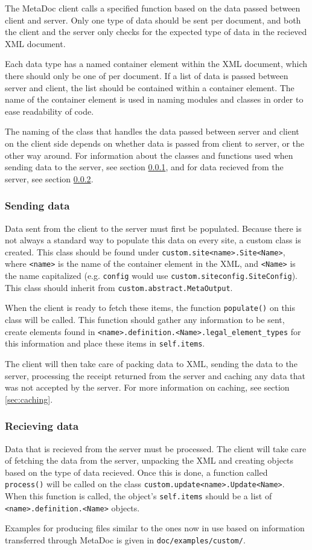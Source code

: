 The MetaDoc client calls a specified function based on the data passed between
client and server. Only one type of data should be sent per document, and both
the client and the server only checks for the expected type of data in the
recieved XML document. 

Each data type has a named container element within the XML document, which
there should only be one of per document. If a list of data is passed between
server and client, the list should be contained within a container element. The
name of the container element is used in naming modules and classes in order to
ease readability of code. 

The naming of the class that handles the data passed between server and client
on the client side depends on whether data is passed from client to server, or
the other way around. For information about the classes and functions used when
sending data to the server, see section \ref{sec:customizing_client_send}, and
for data recieved from the server, see section
\ref{sec:customizing_client_recieve}. 

\subsubsection{Sending data}
\label{sec:customizing_client_send}
Data sent from the client to the server must first be populated. Because there
is not always a standard way to populate this data on every site, a custom
class is created. This class should be found under
\texttt{custom.site<name>.Site<Name>}, where \texttt{<name>} is the name of the
container element in the XML, and \texttt{<Name>} is the name capitalized (e.g. 
\texttt{config} would use \texttt{custom.siteconfig.SiteConfig}). This class
should inherit from \texttt{custom.abstract.MetaOutput}. 

When the client is ready to fetch these items, the function \texttt{populate()}
on this class will be called. This function should gather any information to be
sent, create elements found in
\texttt{<name>.definition.<Name>.legal\_element\_types} for this information 
and place these items in \texttt{self.items}. 

The client will then take care of packing data to XML, sending the data to the
server, processing the receipt returned from the server and caching any data
that was not accepted by the server. For more information on caching, see
section \ref{sec:caching}.

\subsubsection{Recieving data}
\label{sec:customizing_client_recieve}
Data that is recieved from the server must be processed. The client will take
care of fetching the data from the server, unpacking the XML and creating
objects based on the type of data recieved. Once this is done, a function
called \texttt{process()} will be called on the class
\texttt{custom.update<name>.Update<Name>}. When this function is called, the 
object's \texttt{self.items} should be a list of 
\texttt{<name>.definition.<Name>} objects.

Examples for producing files similar to the ones now in use based on
information transferred through MetaDoc is given in
\texttt{doc/examples/custom/}.

